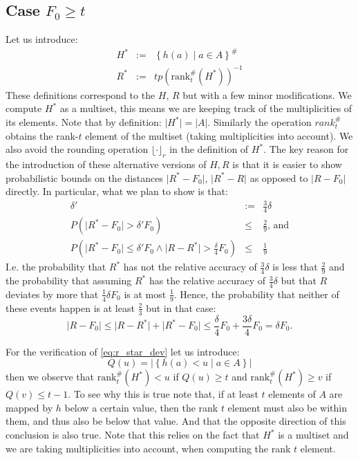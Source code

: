 \documentclass[11pt,a4paper]{article}
\newcommand{\size}[1]{\lvert#1\rvert}
\begin{document}
\subsection{Case $F_0 \geq t$}
Let us introduce:
\begin{eqnarray*}
    H^* & := & \left\{ h(a) \middle \vert a \in A \right\}^{\#} \\
    R^* & := & tp \left( \mathrm{rank}^{\#}_t(H^*) \right)^{-1}
\end{eqnarray*}
These definitions correspond to the $H$, $R$ but with a few minor modifications.
We compute $H^*$ as a multiset, this means we are keeping track of the multiplicities of its elements.
Note that by definition: $\size{H^*}=\size{A}$.
Similarly the operation $rank^{\#}_t$ obtains the rank-$t$ element of the multiset (taking multiplicities into account).
We also avoid the rounding operation $\lfloor \cdot \rfloor_r$ in the definition of $H^*$.
The key reason for the introduction of these alternative versions of $H, R$ is that it is easier to show probabilistic bounds on the distances $\size{R^* - F_0}$, 
$\size{R^* - R}$ as opposed to $\size{R - F_0}$ directly.
In particular, what we plan to show is that:
\begin{eqnarray}
 \delta' & := & \frac{3}{4}\delta \\
 P\left(\size{R^*-F_0} > \delta' F_0\right) & \leq & \frac{2}{9} \textrm{, and} \label{eq:r_star_dev} \\
 P\left(\size{R^*-F_0} \leq \delta' F_0 \wedge \size{R-R^*} > \frac{\delta}{4} F_0\right) & \leq & \frac{1}{9} \label{eq:r_star_r}
\end{eqnarray}
I.e. the probability that $R^*$ has not the relative accuracy of $\frac{3}{4}\delta$ is less that $\frac{2}{9}$ and the probability 
that assuming $R^*$ has the relative accuracy of $\frac{3}{4}\delta$ but that $R$ deviates by more that $\frac{1}{4}\delta F_0$ is at most $\frac{1}{9}$.
Hence, the probability that neither of these events happen is at least $\frac{2}{3}$ but in that case:
\begin{equation}
    \label{eq:concl}
    \size{R-F_0} \leq \size{R - R^*} + \size{R^*-F_0} \leq \frac{\delta}{4} F_0 + \frac{3 \delta}{4} F_0 = \delta F_0 \textrm{.}
\end{equation}

For the verification of \autoref{eq:r_star_dev} let us introduce:
\[
    Q(u) = \size{\left\{h(a) < u \mid a \in A \right\}}
\]
then we observe that $\mathrm{rank}_t^{\#}(H^*) < u$ if $Q(u) \geq t$ and $\mathrm{rank}_t^{\#}(H^*) \geq v$ if $Q(v) \leq t-1$.
To see why this is true note that, if at least $t$ elements of $A$ are mapped by $h$ below a certain value, then the rank $t$ element must also be within them, and thus also be below that value.
And that the opposite direction of this conclusion is also true.
Note that this relies on the fact that $H^*$ is a multiset and we are taking multiplicities into account, when computing the rank $t$ element. 
\end{document}

